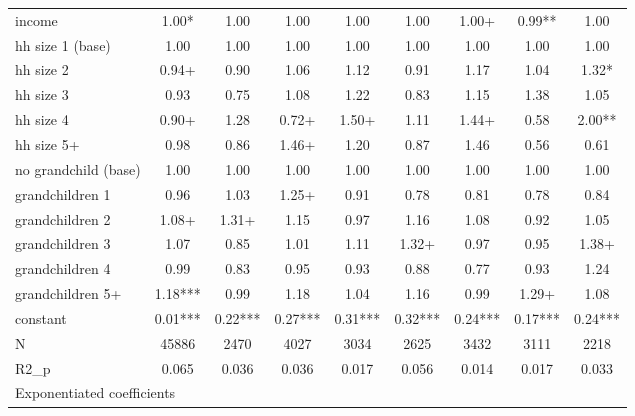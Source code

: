 {\begin{tabular}{l*{8}{c}}
income      &        1.00*  &        1.00   &        1.00   &        1.00   &        1.00   &        1.00+  &        0.99** &        1.00   \\
hh size 1 (base)&        1.00   &        1.00   &        1.00   &        1.00   &        1.00   &        1.00   &        1.00   &        1.00   \\
hh size 2   &        0.94+  &        0.90   &        1.06   &        1.12   &        0.91   &        1.17   &        1.04   &        1.32*  \\
hh size 3   &        0.93   &        0.75   &        1.08   &        1.22   &        0.83   &        1.15   &        1.38   &        1.05   \\
hh size 4   &        0.90+  &        1.28   &        0.72+  &        1.50+  &        1.11   &        1.44+  &        0.58   &        2.00** \\
hh size 5+  &        0.98   &        0.86   &        1.46+  &        1.20   &        0.87   &        1.46   &        0.56   &        0.61   \\
no grandchild (base) &        1.00   &        1.00   &        1.00   &        1.00   &        1.00   &        1.00   &        1.00   &        1.00   \\
grandchildren 1&        0.96   &        1.03   &        1.25+  &        0.91   &        0.78   &        0.81   &        0.78   &        0.84   \\
grandchildren 2&        1.08+  &        1.31+  &        1.15   &        0.97   &        1.16   &        1.08   &        0.92   &        1.05   \\
grandchildren 3&        1.07   &        0.85   &        1.01   &        1.11   &        1.32+  &        0.97   &        0.95   &        1.38+  \\
grandchildren 4&        0.99   &        0.83   &        0.95   &        0.93   &        0.88   &        0.77   &        0.93   &        1.24   \\
grandchildren 5+&        1.18***&        0.99   &        1.18   &        1.04   &        1.16   &        0.99   &        1.29+  &        1.08   \\
constant    &        0.01***&        0.22***&        0.27***&        0.31***&        0.32***&        0.24***&        0.17***&        0.24***\\
\hline
N           &       45886   &        2470   &        4027   &        3034   &        2625   &        3432   &        3111   &        2218   \\
R2\_p        &       0.065   &       0.036   &       0.036   &       0.017   &       0.056   &       0.014   &       0.017   &       0.033   \\
\hline\hline
\multicolumn{9}{l}{\footnotesize Exponentiated coefficients}\\
\end{tabular}
}
